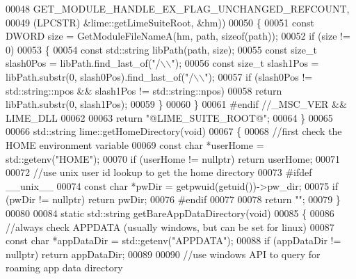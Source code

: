 \begin{DoxyCode}
00048         GET\_MODULE\_HANDLE\_EX\_FLAG\_UNCHANGED\_REFCOUNT,
00049         (LPCSTR) &lime::getLimeSuiteRoot, &hm))
00050     \{
00051         \textcolor{keyword}{const} DWORD size = GetModuleFileNameA(hm, path, \textcolor{keyword}{sizeof}(path));
00052         \textcolor{keywordflow}{if} (size != 0)
00053         \{
00054             \textcolor{keyword}{const} std::string libPath(path, size);
00055             \textcolor{keyword}{const} \textcolor{keywordtype}{size\_t} slash0Pos = libPath.find\_last\_of(\textcolor{stringliteral}{"/\(\backslash\)\(\backslash\)"});
00056             \textcolor{keyword}{const} \textcolor{keywordtype}{size\_t} slash1Pos = libPath.substr(0, slash0Pos).find\_last\_of(\textcolor{stringliteral}{"/\(\backslash\)\(\backslash\)"});
00057             \textcolor{keywordflow}{if} (slash0Pos != std::string::npos && slash1Pos != std::string::npos)
00058                 \textcolor{keywordflow}{return} libPath.substr(0, slash1Pos);
00059         \}
00060     \}
00061 \textcolor{preprocessor}{    #endif //\_MSC\_VER && LIME\_DLL}
00062 
00063     \textcolor{keywordflow}{return} \textcolor{stringliteral}{"@LIME\_SUITE\_ROOT@"};
00064 \}
00065 
00066 std::string lime::getHomeDirectory(\textcolor{keywordtype}{void})
00067 \{
00068     \textcolor{comment}{//first check the HOME environment variable}
00069     \textcolor{keyword}{const} \textcolor{keywordtype}{char} *userHome = std::getenv(\textcolor{stringliteral}{"HOME"});
00070     \textcolor{keywordflow}{if} (userHome != \textcolor{keyword}{nullptr}) \textcolor{keywordflow}{return} userHome;
00071 
00072     \textcolor{comment}{//use unix user id lookup to get the home directory}
00073 \textcolor{preprocessor}{    #ifdef \_\_unix\_\_}
00074     \textcolor{keyword}{const} \textcolor{keywordtype}{char} *pwDir = getpwuid(getuid())->pw\_dir;
00075     \textcolor{keywordflow}{if} (pwDir != \textcolor{keyword}{nullptr}) \textcolor{keywordflow}{return} pwDir;
00076 \textcolor{preprocessor}{    #endif}
00077 
00078     \textcolor{keywordflow}{return} \textcolor{stringliteral}{""};
00079 \}
00080 
00084 \textcolor{keyword}{static} std::string getBareAppDataDirectory(\textcolor{keywordtype}{void})
00085 \{
00086     \textcolor{comment}{//always check APPDATA (usually windows, but can be set for linux)}
00087     \textcolor{keyword}{const} \textcolor{keywordtype}{char} *appDataDir = std::getenv(\textcolor{stringliteral}{"APPDATA"});
00088     \textcolor{keywordflow}{if} (appDataDir != \textcolor{keyword}{nullptr}) \textcolor{keywordflow}{return} appDataDir;
00089 
00090     \textcolor{comment}{//use windows API to query for roaming app data directory}

\end{DoxyCode}
